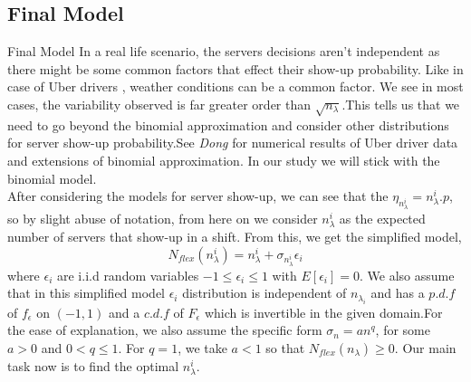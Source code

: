 \documentclass[8pt]{beamer}
\begin{document}
 \subsection{Final Model}
\begin{frame}{Final Model}
    In a real life scenario, the servers decisions aren't independent as there might be some common factors that effect their show-up probability. Like in case of Uber drivers , weather conditions can be a common factor. We see in most cases, the variability observed is far greater order than $\sqrt{n_\lambda}$.This tells us that we need to go beyond the binomial approximation and consider other distributions for server show-up probability.See \textit{Dong} \cite{dong} for numerical results of Uber driver data and extensions of binomial approximation. In our study we will stick with the binomial model.
    \\ After considering the models for server show-up, we can see that the $\eta_{n_\lambda^{i}}=n_\lambda^{i}.p$, so by slight abuse of notation, from here on we consider $n_\lambda^{i}$ as the expected number of servers that show-up in a shift. From this, we get the simplified model,$$N_{flex}(n_\lambda^{i})=n_\lambda^{i}+\sigma_{n_\lambda^{i}}\epsilon_i$$ where $\epsilon_i$ are i.i.d random variables $ -1 \leq \epsilon_i \leq 1$ with $E[\epsilon_i]=0$. We also assume that in this simplified model $\epsilon_i$ distribution is independent of $n_\lambda_{i}$ and has a $p.d.f$ of $f_\epsilon$ on $(-1,1)$ and a $c.d.f$ of $F_\epsilon$ which is invertible in the given domain.For the ease of explanation, we also assume the specific form $\sigma_n = an^q$, for some $a > 0$ and $0<q\leq1$. For $q = 1$, we take $a < 1$ so that $N_{flex}(n_\lambda) \geq 0$. Our main task now is to find the optimal $n_{\lambda}^{i}$.
\end{frame}
\end{document}
